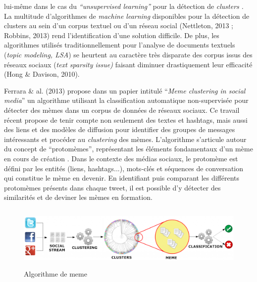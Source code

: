 lui-m\^eme dans le cas du \textit{{\textquotedblleft}unsupervised
learning{\textquotedblright}} pour la d\'etection de \textit{clusters
}\cite{Breiman2001}\textit{. }La multitude d{\textquoteright}algorithmes
de \textit{machine learning }disponibles pour la d\'etection de
clusters au sein d{\textquoteright}un corpus textuel ou
d{\textquoteright}un r\'eseau social (Nettleton, 2013 ; Robbins, 2013)
rend l{\textquoteright}identification d{\textquoteright}une solution
difficile. De plus, les algorithmes utilis\'es traditionnellement pour
l{\textquoteright}analyse de documents textuels (\textit{topic
modeling, LSA}) se heurtent au caract\`ere tr\`es disparate des corpus
issus des r\'eseaux sociaux (\textit{text sparsity issue) }faisant
diminuer drastiquement leur efficacit\'e (Hong \& Davison, 2010). 



Ferrara \& al. (2013) propose dans un papier intitul\'e
{\textquotedblleft}\textit{Meme clustering in social
media}{\textquotedblright} un algorithme utilisant la classification
automatique non-supervis\'ee pour d\'etecter des m\`emes dans un corpus
de donn\'ees de r\'eseaux sociaux. Ce travail r\'ecent propose de tenir
compte non seulement des textes et hashtags, mais aussi des liens et
des mod\`eles de diffusion pour identifier des groupes de messages
int\'eressants et proc\'eder au \textit{clustering }des m\`emes.
L{\textquoteright}algorithme s{\textquoteright}articule autour du
concept de {\textquotedblleft}protom\`emes{\textquotedblright},
repr\'esentant les \'el\'ements fondamentaux d{\textquoteright}un
m\`eme en cours de cr\'eation \cite{Gabora1997}. Dans le contexte des
m\'edias sociaux, le protom\`eme est d\'efini par les entit\'es (liens,
hashtags...), mots-cl\'es et s\'equences de conversation qui constitue
le m\`eme en devenir. En identifiant puis comparant les diff\'erents
protom\`emes pr\'esents dans chaque tweet, il est possible
d{\textquoteright}y d\'etecter des similarit\'es et de deviner les
m\`emes en formation. 

\begin{figure} 
    \centering

    \includegraphics[width=5.8894in,height=1.2114in]{figures/chap3/chapitre3-img6.png}
    \caption{Algorithme de {\textquotedbl}meme}
\end{figure}

